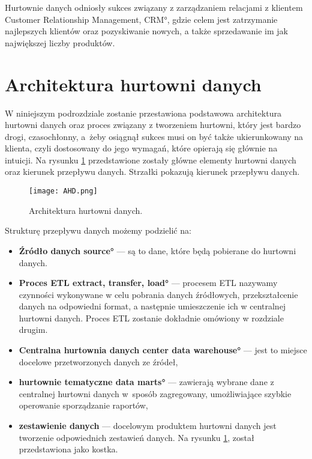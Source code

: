 Hurtownie danych odniosły sukces związany z zarządzaniem relacjami z klientem 
\ang{Customer Relationship Management, CRM},
 gdzie celem jest zatrzymanie najlepszych klientów oraz pozyskiwanie nowych,
 a także sprzedawanie im jak największej liczby produktów.
 

\section{Architektura hurtowni danych} \label{p_temat}
  W niniejszym podrozdziale zostanie przestawiona podstawowa architektura hurtowni danych oraz 
   proces związany z tworzeniem hurtowni, który jest bardzo drogi, czasochłonny, 
   a~żeby osiągnął sukces musi on być także ukierunkowany na klienta,
   czyli dostosowany do jego wymagań, 
   które opierają się głównie na intuicji.
   Na rysunku \ref{fig:AHD} przedstawione zostały główne elementy hurtowni danych oraz kierunek przepływu danych.
   Strzałki pokazują kierunek przepływu danych.\cite{TodMan} \cite{link_hd}

\begin{center}
\begin{figure}[H]
  \begin{center}
    \texttt{[image: AHD.png]}
  \end{center}
 \caption{Architektura hurtowni danych. }
    \label{fig:AHD}
\end{figure}
\end{center}


Strukturę przepływu danych możemy podzielić na:
\begin{itemize}
 \item \textbf{Źródło danych \ang{source} } --- 
    są to dane, które będą pobierane do hurtowni danych. 
 \item \textbf{Proces ETL \ang{extract, transfer, load} } --- 
    procesem ETL nazywamy czynności wykonywane w celu pobrania danych źródłowych,
    przekształcenie danych na odpowiedni format, a następnie umieszczenie ich w centralnej hurtowni danych.
    Proces ETL zostanie dokładnie omówiony w rozdziale drugim.
 \item \textbf{Centralna hurtownia danych \ang{center data  warehouse}} --- 
    jest to miejsce docelowe przetworzonych danych ze źródeł,						                                          
 \item \textbf{hurtownie tematyczne \ang{data marts}} --- 
    zawierają wybrane dane z centralnej hurtowni danych w~sposób 
    zagregowany, umożliwiające szybkie operowanie sporządzanie raportów,
 \item \textbf{zestawienie danych } --- 
    docelowym produktem hurtowni danych jest tworzenie odpowiednich zestawień danych.
    Na rysunku \ref{fig:AHD}, został przedstawiona jako kostka.
\end{itemize}

